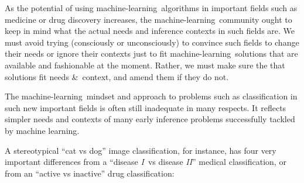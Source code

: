 \documentclass[\ifafour a4paper,12pt,\else a5paper,10pt,\fi%
onecolumn,oneside,article,%
british%
]{memoir}
\theoremstyle{remark}
\theoremstyle{innote}
\newcommand*{\amp}{\&}
\renewcommand*{\|}[1][]{\nonscript\:#1\vert\nonscript\:\mathopen{}}
\newcommand*{\ml}{machine-learning}
\newcommand*{\tI}{\textit{I}}
\newcommand*{\tII}{\textit{II}}
\begin{document}
As the potential of using \ml\ algorithms in important fields such as medicine or drug discovery increases, the \ml\ community ought to keep in mind what the actual needs and inference contexts in such fields are. We must avoid trying (consciously or unconsciously) to convince such fields to change their needs or ignore their contexts just to fit \ml\ solutions that are available and fashionable at the moment. Rather, we must make sure the that solutions fit needs \amp\ context, and amend them if they do not.

The \ml\ mindset and approach to problems such as classification in such new important fields is often still inadequate in many respects. It reflects simpler needs and contexts of many early inference problems successfully tackled by machine learning.

A stereotypical \enquote{cat vs dog} image classification, for instance, has four very important differences from a \enquote{disease \tI\ vs disease \tII} medical classification, or from an \enquote{active vs inactive} drug classification:
\end{document}
